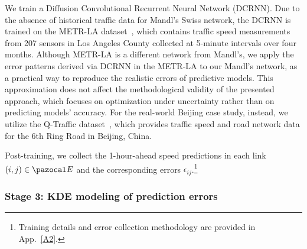 \documentclass[a4paper,fleqn]{cas-sc}
\begin{document}
We train a Diffusion Convolutional Recurrent Neural Network (DCRNN). 
Due to the absence of historical traffic data for Mandl’s Swiss network, the DCRNN is trained on the METR-LA dataset~\citep{li2017diffusion}, which contains traffic speed measurements from 207 sensors in Los Angeles County collected at 5-minute intervals over four months. Although METR-LA is a different network from Mandl's, we apply the error patterns derived via DCRNN in the METR-LA to our Mandl's network, as a practical way to reproduce the realistic errors of predictive models. This approximation does not affect the methodological validity of the presented approach, which focuses on optimization under uncertainty rather than on predicting models' accuracy.
%
For the real-world Beijing case study, instead, we utilize the Q-Traffic dataset~\citep{liao2018deep}, which provides traffic speed and road network data for the 6th Ring Road in Beijing, China. 

Post-training, we collect the 1-hour-ahead speed predictions in each link $(i,j)\in\pazocal E$ and the corresponding errors $\epsilon_{ij}$.\footnote{Training details and error collection methodology are provided in App.~\ref{A2}.}



\subsubsection{Stage 3: KDE modeling of prediction errors}\label{sec:errorStage3}


%
\end{document}
